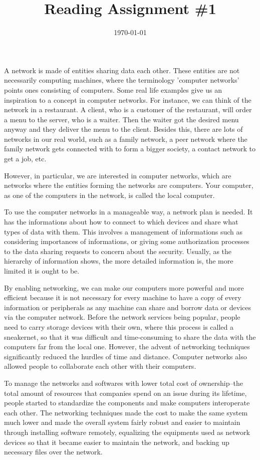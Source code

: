 \documentclass{homework}
\title{Reading Assignment \#1}
\date{\today}
\begin{document}
\maketitle



A network is made of entities sharing data each other. These entities are not necessarily computing machines, where the terminology 'computer networks' points ones consisting of computers. Some real life examples give us an inspiration to a concept in computer networks. For instance, we can think of the network in a restaurant. A client, who is a customer of the restaurant, will order a menu to the server, who is a waiter. Then the waiter got the desired menu anyway and they deliver the menu to the client. Besides this, there are lots of networks in our real world, such as a family network, a peer network where the family network gets connected with to form a bigger society, a contact network to get a job, etc.

However, in particular, we are interested in computer networks, which are networks where the entities forming the networks are computers. Your computer, as one of the computers in the network, is called the local computer.

To use the computer networks in a manageable way, a network plan is needed. It has the informations about how to connect to which devices and share what types of data with them. This involves a management of informations such as considering importances of informations, or giving some authorization processes to the data sharing requests to concern about the security. Usually, as the hierarchy of information shows, the more detailed information is, the more limited it is ought to be.

By enabling networking, we can make our computers more powerful and more efficient because it is not necessary for every machine to have a copy of every information or peripherals as any machine can share and borrow data or devices via the computer network. Before the network services being popular, people need to carry storage devices with their own, where this process is called a sneakernet, so that it was difficult and time-consuming to share the data with the computers far from the local one. However, the advent of networking techniques significantly reduced the hurdles of time and distance. Computer networks also allowed people to collaborate each other with their computers.

To manage the networks and softwares with lower total cost of ownership--the total amount of resources that companies spend on an issue during its lifetime, people started to standardize the components and make computers interoperate each other. The networking techniques made the cost to make the same system much lower and made the overall system fairly robust and easier to maintain through installing software remotely, equalizing the equipments used as network devices so that it became easier to maintain the network, and backing up necessary files over the network.
\end{document}
